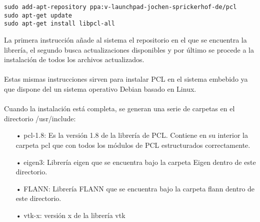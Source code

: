 
\begin{verbatim}
sudo add-apt-repository ppa:v-launchpad-jochen-sprickerhof-de/pcl
sudo apt-get update
sudo apt-get install libpcl-all
\end{verbatim}

La primera instrucción añade al sistema el repositorio en el que se encuentra la librería, el segundo busca actualizaciones disponibles y por último se procede a la instalación de todos los archivos actualizados.
\\
\\
Estas mismas instrucciones sirven para instalar PCL en el sistema embebido ya que dispone del un sistema operativo Debian basado en Linux.
\\
\\
Cuando la instalación está completa, se generan una serie de carpetas en el directorio /usr/include:

\begin{itemize}
\item[•]pcl-1.8: Es la versión 1.8 de la librería de PCL. Contiene en su interior la carpeta pcl que con todos los módulos de PCL estructurados correctamente.
\item[•]eigen3: Librería eigen que se encuentra bajo la carpeta Eigen dentro de este directorio.
\item[•]FLANN: Librería FLANN que se encuentra bajo la carpeta flann dentro de este directorio.
\item[•]vtk-x: versión x de la librería vtk 
\end{itemize}

